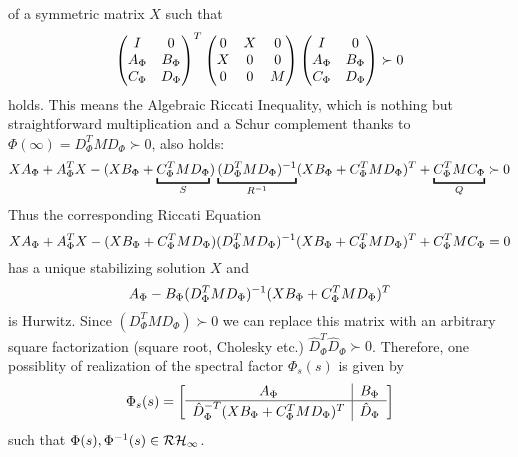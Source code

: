 of a symmetric matrix $X$ such that 
\begin{equation}
\begin{pmatrix}I &0\\A_{\Phi} &B_{\Phi}\\C_{\Phi}&D_{\Phi}\end{pmatrix}^T
\begin{pmatrix}0 &X &0\\X &0 &0\\0 &0 &M\end{pmatrix}
\begin{pmatrix}I &0\\A_{\Phi} &B_{\Phi}\\C_{\Phi}&D_{\Phi}\end{pmatrix} \succ 0
\label{eq:specfactLMI}
\end{equation}
holds. This means the Algebraic Riccati Inequality, which is nothing but straightforward multiplication and a Schur complement
thanks to $\Phi(\infty)=D^T_\Phi M D_\Phi\succ 0$, also holds:
\begin{equation}
XA_{\Phi} + A^T_{\Phi}X - (XB_{\Phi}+\underbracket{C_{\Phi}^TMD_\Phi}_S)\underbracket{\inv{(D^T_{\Phi}MD_{\Phi})}}_{\inv{R}}
(XB_{\Phi}+C_{\Phi}^TMD_\Phi)^T+\underbracket{C^T_{\Phi}MC_{\Phi}}_Q \succ 0
\label{eq:specfactARI}
\end{equation}
Thus the corresponding Riccati Equation 
\begin{equation}
XA_{\Phi} + A^T_{\Phi}X - (XB_{\Phi}+C_{\Phi}^TMD_\Phi)(D^T_{\Phi}MD_{\Phi})^{-1}
(XB_{\Phi}+C_{\Phi}^TMD_\Phi)^T+C^T_{\Phi}MC_{\Phi} = 0
\label{eq:specfactARE}
\end{equation}
has a unique stabilizing solution $X$ and 
\[
A_\Phi - B_\Phi(D^T_{\Phi}MD_{\Phi})^{-1}(XB_{\Phi}+C_{\Phi}^TMD_\Phi)^T
\]
is Hurwitz. Since $(D^T_{\Phi}MD_{\Phi})\succ 0$ we can replace this matrix with an arbitrary square factorization (square root,
Cholesky etc.) $\hat{D}_\Phi^T\hat{D}_\Phi\succ 0$. Therefore, one possiblity of realization of the spectral factor $\Phi_s(s)$ is given by
\[
\Phi_s(s) = \left[
\begin{array}{c|c}
	A_\Phi &B_\Phi\\\hline
	\hat{D}_\Phi^{\mathstrut -T}(XB_{\Phi}+C_{\Phi}^TMD_\Phi)^T&\hat{D}_\Phi
\end{array}
\right]
\]
such that $\Phi(s),\Phi^{-1}(s)\in\mathcal{RH}_\infty$. 



